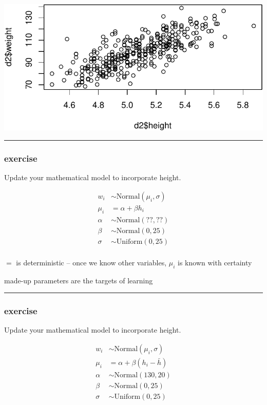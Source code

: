 \documentclass[
  letterpaper,
  DIV=11,
  numbers=noendperiod]{scrartcl}
\begin{document}
\includegraphics[width=17.1875in,height=\textheight]{lecture02-1_files/figure-pdf/unnamed-chunk-25-1.pdf}

\begin{center}\rule{0.5\linewidth}{0.5pt}\end{center}

\subsubsection{exercise}\label{exercise-2}

Update your mathematical model to incorporate height.

\begin{align*}
w_i &\sim \text{Normal}(\mu_i, \sigma) \\
\mu_i &= \alpha + \beta h_i \\
\alpha &\sim \text{Normal}(??, ??) \\
\beta &\sim \text{Normal}(0, 25) \\
\sigma &\sim \text{Uniform}(0, 25) \\
\end{align*}

\(=\) is deterministic -- once we know other variables, \(\mu_i\) is
known with certainty

made-up parameters are the targets of learning

\begin{center}\rule{0.5\linewidth}{0.5pt}\end{center}

\subsubsection{exercise}\label{exercise-3}

Update your mathematical model to incorporate height.

\begin{align*}
w_i &\sim \text{Normal}(\mu_i, \sigma) \\
\mu_i &= \alpha + \beta (h_i - \bar{h}) \\
\alpha &\sim \text{Normal}(130, 20) \\
\beta &\sim \text{Normal}(0, 25) \\
\sigma &\sim \text{Uniform}(0, 25) \\
\end{align*}
\end{document}
